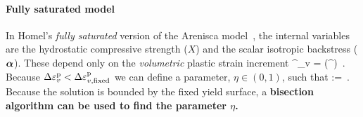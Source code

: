 \documentclass[11pt,a4paper]{article}
\begin{document}
\paragraph{Fully saturated model}
In Homel's {\em fully saturated} version of the Arenisca model~\citep{Homel2015}, the internal variables are 
the hydrostatic compressive strength ($X$) and the scalar isotropic backstress ($\boldsymbol{\alpha}$).  These 
depend only on the {\em volumetric} plastic strain increment 
\Beq
  \Delta\Veps^\Tp_v = \Tr(\Delta\Bveps^\Tp) \,.
\Eeq
Because $\Delta\varepsilon^{\text{p}}_v < \Delta\varepsilon^{\text{p}}_{v,\text{fixed}}$ we can define a parameter, $\eta \in (0, 1)$, such 
that
\Beq
  \eta :=  \,.
\Eeq
Because the solution is bounded by the fixed yield surface, a {\bf bisection algorithm can be used
to find the parameter $\eta$.}
\end{document}
